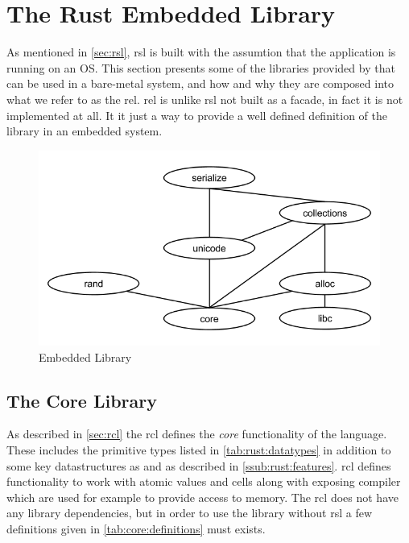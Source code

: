 \section{The Rust Embedded Library}
\label{sec:rel}

As mentioned in \autoref{sec:rsl}, \gls{rsl} is built with the assumtion that the application is running on an OS.
This section presents some of the libraries provided by {\rust} that can be used in a bare-metal system, and how and why they are composed into what we refer to as the \gls{rel}.
\gls{rel} is unlike \gls{rsl} not built as a facade, in fact it is not implemented at all.
It it just a way to provide a well defined definition of the {\rust} library in an embedded system.

\begin{figure}[H]
  \begin{center}
    \includegraphics[scale=0.3]{figures/background/rust/embedded-rust-lib.png}
  \end{center}
  \caption{{\rust} Embedded Library}
  \label{fig:rust:rel}
\end{figure}

\subsection{The Core Library}
\label{sec:rust:core}

As described in \autoref{sec:rcl} the \gls{rcl} defines the \emph{core} functionality of the {\rust} language.
These includes the primitive types listed in \autoref{tab:rust:datatypes} in addition to some key datastructures as  and  as described in \autoref{ssub:rust:features}.
\gls{rcl} defines functionality to work with atomic values and cells along with exposing compiler  which are used for example to provide  access to memory.
The \gls{rcl} does not have any library dependencies, but in order to use the library without \gls{rsl} a few definitions given in \autoref{tab:core:definitions} must exists.

